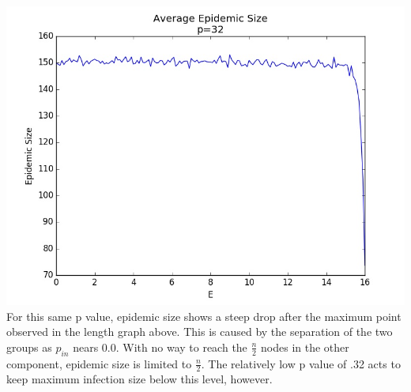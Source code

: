 \documentclass[11pt, oneside]{article}   	%
\begin{document}
\includegraphics[scale=0.5]{p32size}\\
\indent For this same p value, epidemic size shows a steep drop after the maximum point observed in the length graph above.  This is caused by the separation of the two groups as $p_{in}$ nears 0.0.  With no way to reach the $\frac{n}{2}$ nodes in the other component, epidemic size is limited to $\frac{n}{2}$.  The relatively low p value of .32 acts to keep maximum infection size below this level, however.\\\\\\\\\\\\\\\\\\\\\\\\\\\\\\\\\\\\
\inputminted[linenos,fontsize=\scriptsize]{python}{fastq1.py}
\end{document}
